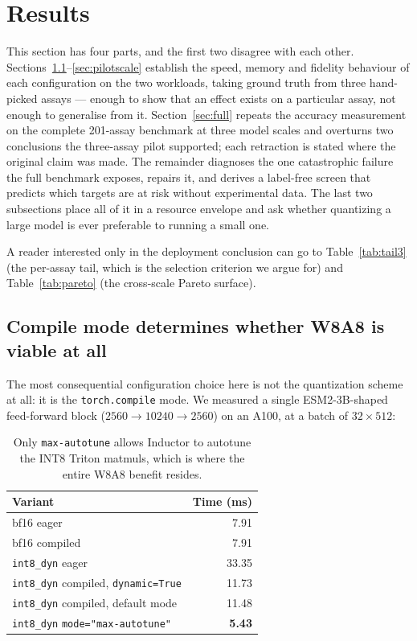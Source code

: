 \documentclass[11pt]{article}
\newcommand{\cfg}[1]{\texttt{#1}}
\newcommand{\best}[1]{\textbf{#1}}
\begin{document}
\section{Results}

This section has four parts, and the first two disagree with each other.
Sections~\ref{sec:compile}--\ref{sec:pilotscale} establish the speed, memory and
fidelity behaviour of each configuration on the two workloads, taking ground
truth from three hand-picked assays --- enough to show that an effect exists on
a particular assay, not enough to generalise from it.
Section~\ref{sec:full} repeats the accuracy measurement on the complete
201-assay benchmark at three model scales and overturns two conclusions the
three-assay pilot supported; each retraction is stated where the original claim
was made. The remainder diagnoses the one catastrophic failure the full
benchmark exposes, repairs it, and derives a label-free screen that predicts
which targets are at risk without experimental data. The last two subsections
place all of it in a resource envelope and ask whether quantizing a large model
is ever preferable to running a small one.

A reader interested only in the deployment conclusion can go to
Table~\ref{tab:tail3} (the per-assay tail, which is the selection criterion we
argue for) and Table~\ref{tab:pareto} (the cross-scale Pareto surface).

\subsection{Compile mode determines whether W8A8 is viable at all}
\label{sec:compile}

The most consequential configuration choice here is not the quantization
scheme at all: it is the \texttt{torch.compile} mode. We measured a single
ESM2-3B-shaped feed-forward block ($2560 \to 10240 \to 2560$) on an A100, at a
batch of $32 \times 512$:

\begin{table}[htb]
\centering
\caption{Only \texttt{max-autotune} allows Inductor to autotune the INT8 Triton
matmuls, which is where the entire W8A8 benefit resides.}
\small
\begin{tabular}{lr}
\toprule
Variant & Time (ms) \\
\midrule
bf16 eager                                   & 7.91 \\
bf16 compiled                                & 7.91 \\
\cfg{int8\_dyn} eager                        & 33.35 \\
\cfg{int8\_dyn} compiled, \texttt{dynamic=True} & 11.73 \\
\cfg{int8\_dyn} compiled, default mode       & 11.48 \\
\cfg{int8\_dyn} \texttt{mode="max-autotune"} & \best{5.43} \\
\bottomrule
\end{tabular}
\end{table}
\end{document}
